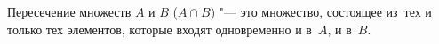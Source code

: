 
    Пересечение множеств $A$ и $B$  ($A\cap B$) "--- это множество, состоящее из~тех и только тех элементов, которые входят одновременно и в~$A$, и в~$B$.
